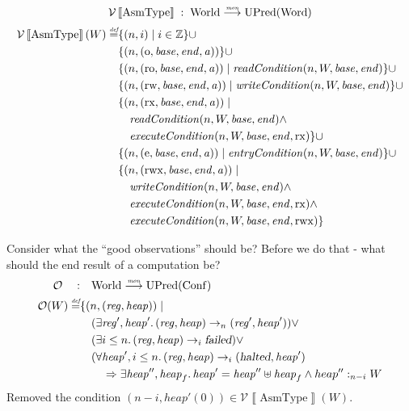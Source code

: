 \documentclass{article}
\newcommand{\sem}[1]{\left\llbracket #1 \right\rrbracket}
\newcommand{\monfun}{\stackrel{\textit{\tiny{mon}}}{\longrightarrow}}
\newcommand{\defeq}{\stackrel{\textit{\tiny{def}}}{=}}
\newcommand{\union}{\mathbin{\cup}}
\newcommand{\var}[1]{\mathit{#1}}
\newcommand{\addr}{\var{a}}
\newcommand{\start}{\var{base}}
\newcommand{\addrend}{\var{end}}
\newcommand{\reg}{\var{reg}}
\newcommand{\heap}{\var{heap}}
\newcommand{\perm}{\var{perm}}
\newcommand{\stdcap}[1][\perm]{\left(#1,\start,\addrend,\addr \right)}
\newcommand{\failed}{\textsl{failed}}
\newcommand{\halted}{\textsl{halted}}
\newcommand{\plainfun}[1]{\mathit{#1}}
\newcommand{\readCond}[1]{\plainfun{readCondition}(#1)}
\newcommand{\writeCond}[1]{\plainfun{writeCondition}(#1)}
\newcommand{\execCond}[1]{\plainfun{executeCondition}(#1)}
\newcommand{\entryCond}[1]{\plainfun{entryCondition}(#1)}
\newcommand{\heapSat}[3][\heap]{#1 :_{#2} #3}
\newcommand{\asmType}{\plaindom{AsmType}}
\newcommand{\plaindom}[1]{\mathrm{#1}}
\newcommand{\Words}{\plaindom{Word}}
\newcommand{\Confs}{\plaindom{Conf}}
\newcommand{\ints}{\mathbb{Z}}
\newcommand{\Worlds}{\plaindom{World}}
\newcommand{\UPred}[1]{\plaindom{UPred}(#1)}
\newcommand{\intr}[2]{\mathcal{#1}\sem{#2}}
\newcommand{\valueintr}[1]{\intr{V}{#1}}
\newcommand{\stdvr}{\valueintr{\asmType}}
\newcommand{\observations}{\mathcal{O}}
\newcommand{\npair}[2][n]{\left(#1,#2 \right)}
\newcommand{\plainperm}[1]{\mathrm{#1}}
\newcommand{\noperm}{\plainperm{o}}
\newcommand{\readonly}{\plainperm{ro}}
\newcommand{\readwrite}{\plainperm{rw}}
\newcommand{\exec}{\plainperm{rx}}
\newcommand{\entry}{\plainperm{e}}
\newcommand{\rwx}{\plainperm{rwx}}
\newcommand{\step}[1][]{\rightarrow_{#1}}
\begin{document}
\[
\stdvr \; : \;  \Worlds \monfun \UPred{\Words}
\]
\begin{align*}
  \stdvr(W) \defeq & \{ \npair{i} \mid i \in \ints \} 
\union \\
                   & \{ \npair{\stdcap[\noperm] }  \} 
\union \\
                   & \{ \npair{\stdcap[\readonly] } \mid \readCond{n,W,\start,\addrend} \} \union \\
                   & \{ \npair{\stdcap[\readwrite] } \mid \writeCond{n,W,\start,\addrend} \} \union \\
                   & \{ \npair{\stdcap[\exec]} \mid \\
                   & \quad\readCond{n,W,\start,\addrend} \land \\
                   & \quad \execCond{n,W,\start,\addrend,\exec} \}
\union \\
                   & \{ \npair{\stdcap[\entry]} \mid \entryCond{n,W,\start,\addrend} \} \union \\
                   & \{ \npair{\stdcap[\rwx]} \mid \\
                   & \quad \writeCond{n,W,\start,\addrend} \land \\
                   & \quad \execCond{n,W,\start,\addrend,\exec} \land \\
                   & \quad \execCond{n,W,\start,\addrend,\rwx} \}
\end{align*}

Consider what the ``good observations'' should be? Before we do that - what should the end result of a computation be?
\begin{align*}
  \observations \quad : & \quad  \Worlds \monfun \UPred{\Confs} \\
  \observations (W) \defeq & \{ \npair{(\reg,\heap)} \mid \\
                           & \quad (\exists \reg', \heap' \ldotp (\reg,\heap) \step[n] (\reg',\heap')) \lor \\ %
                           & \quad (\exists i \leq n \ldotp (\reg,\heap) \step[i] \failed) \lor \\
                           & \quad (\forall \heap', i \leq n \ldotp (\reg,\heap) \step[i] (\halted,\heap')  \\
                           & \qquad \Rightarrow \exists \heap'', \heap_f \ldotp \heap' = \heap'' \uplus \heap_f \land \heapSat[heap'']{n-i}{W}
\end{align*}
Removed the condition $\npair[n-i]{\heap'(0)} \in \stdvr(W)$.\\
\end{document}
